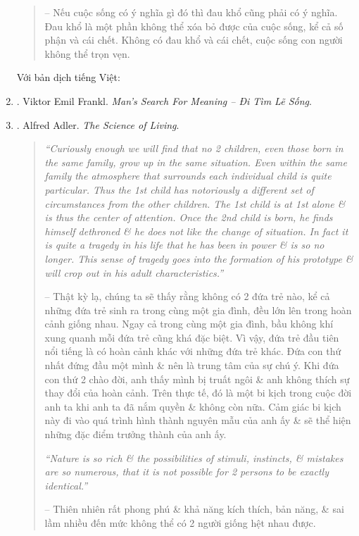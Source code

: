 \documentclass[12pt]{article}
\begin{document}
\begin{enumerate}
\begin{quotation}
		-- Nếu cuộc sống có ý nghĩa gì đó thì đau khổ cũng phải có ý nghĩa. Đau khổ là một phần không thể xóa bỏ được của cuộc sống, kể cả số phận và cái chết. Không có đau khổ và cái chết, cuộc sống con người không thể trọn vẹn.
	\end{quotation}
	Với bản dịch tiếng Việt:
	\item \cite{Frankl_meaning_VN}. {\sc Viktor Emil Frankl}. {\it Man's Search For Meaning -- Đi Tìm Lẽ Sống}.
	\item \cite{Adler_science_living}. {\sc Alfred Adler}. {\it The Science of Living}.
	\begin{quotation}
		{\it``Curiously enough we will find that no 2 children, even those born in the same family, grow up in the same situation. Even within the same family the atmosphere that surrounds each individual child is quite particular. Thus the 1st child has notoriously a different set of circumstances from the other children. The 1st child is at 1st alone \& is thus the center of attention. Once the 2nd child is born, he finds himself dethroned \& he does not like the change of situation. In fact it is quite a tragedy in his life that he has been in power \& is so no longer. This sense of tragedy goes into the formation of his prototype \& will crop out in his adult characteristics.''}
		
		-- Thật kỳ lạ, chúng ta sẽ thấy rằng không có 2 đứa trẻ nào, kể cả những đứa trẻ sinh ra trong cùng một gia đình, đều lớn lên trong hoàn cảnh giống nhau. Ngay cả trong cùng một gia đình, bầu không khí xung quanh mỗi đứa trẻ cũng khá đặc biệt. Vì vậy, đứa trẻ đầu tiên nổi tiếng là có hoàn cảnh khác với những đứa trẻ khác. Đứa con thứ nhất đứng đầu một mình \& nên là trung tâm của sự chú ý. Khi đứa con thứ 2 chào đời, anh thấy mình bị truất ngôi \& anh không thích sự thay đổi của hoàn cảnh. Trên thực tế, đó là một bi kịch trong cuộc đời anh ta khi anh ta đã nắm quyền \& không còn nữa. Cảm giác bi kịch này đi vào quá trình hình thành nguyên mẫu của anh ấy \& sẽ thể hiện những đặc điểm trưởng thành của anh ấy.
		
		{\it``Nature is so rich \& the possibilities of stimuli, instincts, \& mistakes are so numerous, that it is not possible for 2 persons to be exactly identical.''}
		
		-- Thiên nhiên rất phong phú \& khả năng kích thích, bản năng, \& sai lầm nhiều đến mức không thể có 2 người giống hệt nhau được.
		

\end{quotation}
\end{enumerate}
\end{document}
